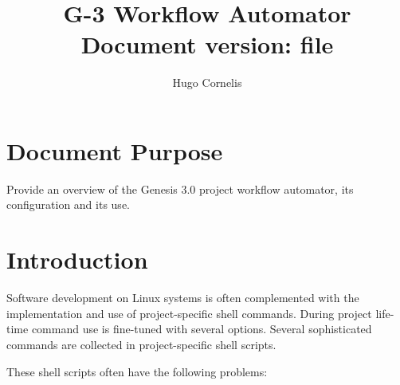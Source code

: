\documentclass[a4paper,openbib,10pt]{article}
\title{G-3 Workflow Automator
  \\
  {\tiny Document version: \pdfmdfivesum file {\jobname}} }
\author{Hugo Cornelis}
\begin{document}

\maketitle

\theoremstyle{plain}

\section{Document Purpose}

Provide an overview of the Genesis 3.0 project workflow automator, its
configuration and its use.


\section{Introduction}

Software development on Linux systems is often complemented with the
implementation and use of project-specific shell commands.  During
project life-time command use is fine-tuned with several options.
Several sophisticated commands are collected in project-specific shell
scripts.




These shell scripts often have the following problems:
\end{document}
